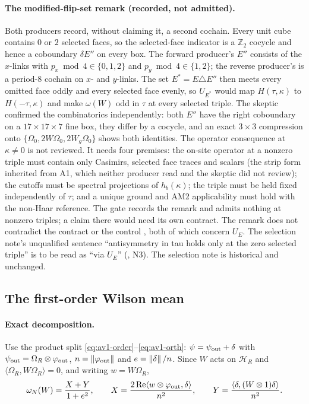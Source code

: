 \paragraph{The modified-flip-set remark (recorded, not admitted).}
Both producers record, without claiming it, a second cochain. Every unit cube
contains $0$ or $2$ selected faces, so the selected-face indicator is a
$\mathbb Z_2$ cocycle and hence a coboundary $\delta E''$ on every box. The
forward producer's $E''$ consists of the $x$-links with $p_x\bmod4\in\{0,1,2\}$
and $p_y\bmod4\in\{1,2\}$; the reverse producer's is a period-8 cochain on $x$-
and $y$-links. The set $E^*=E\triangle E''$ then meets every omitted face
oddly and every selected face evenly, so $U_{E^*}$ would map
$H(\tau,\kappa)$ to $H(-\tau,\kappa)$ and make $\omega(W)$ odd in $\tau$ at
every selected triple. The skeptic confirmed the combinatorics independently:
both $E''$ have the right coboundary on a $17\times17\times7$ fine box, they
differ by a cocycle, and an exact $3\times3$ compression onto
$\{\Omega_0,2W\Omega_0,2W_g\Omega_0\}$ shows both identities. The operator
consequence at $\kappa\ne0$ is not reviewed. It needs four premises: the
on-site operator at a nonzero triple must contain only Casimirs, selected
face traces and scalars (the strip form inherited from A1, which neither
producer read and the skeptic did not review); the cutoffs must be spectral projections of $h_b(\kappa)$; the triple
must be held fixed independently of $\tau$; and a unique ground and AM2
applicability must hold with the non-Haar reference. The gate records the
remark and admits nothing at nonzero triples; a claim there would need its
own contract. The remark does not contradict the contract or the control
, both of which concern $U_E$. The
selection note's unqualified sentence ``antisymmetry in tau holds only at the
zero selected triple'' is to be read as ``via $U_E$''
(, N3). The selection note is
historical and unchanged.

\subsection{The first-order Wilson mean}
\label{sec:aw1-mean}
\paragraph{Exact decomposition.}
Use the product split \eqref{eq:av1-order}--\eqref{eq:av1-orth}:
$\psi=\psi_{\rm out}+\delta$ with $\psi_{\rm out}=\Omega_R\otimes\varphi_{\rm out}$,
$n=\left\lVert\varphi_{\rm out}\right\rVert$ and $e=\left\lVert\delta\right\rVert/n$. Since $W$ acts on
$\mathcal H_R$ and $\langle\Omega_R,W\Omega_R\rangle=0$, and writing
$w=W\Omega_R$,
\begin{equation}
 \omega_N(W)=\frac{X+Y}{1+e^2},\qquad
 X=\frac{2\,\mathrm{Re}\langle w\otimes\varphi_{\rm out},\delta\rangle}{n^2},\qquad
 Y=\frac{\langle\delta,(W\otimes1)\delta\rangle}{n^2}.
 \label{eq:aw1-XY}
\end{equation}

